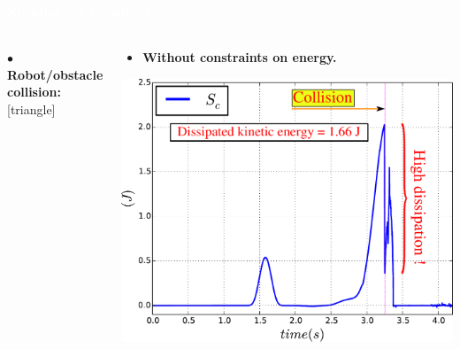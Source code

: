 \begin{frame}
\frametitle{{\textcolor{white}{\hspace{0.2cm}Simulation results 1}}}
  \begin{columns}
    \column{\dimexpr\paperwidth-4pt}
\hspace{2mm}$\bullet$ {\color{red}\textbf{Robot/obstacle collision:}} 
[triangle] 
\begin{itemize}
\begin{columns}
\column{.5\paperwidth}
\begin{center}
\begin{itemize}
\addtolength{\itemindent}{5mm}
\item \textbf{Without constraints on  energy.}
\end{itemize}
\vspace{0.5mm}
\hspace{1mm}
\includegraphics[width=0.72\columnwidth]{figures/ec_obst3!!!!}
\\
\vspace{0.5mm}
\hspace{3mm}


\end{center}
\end{columns}
\end{itemize}
\end{columns}
\end{frame}
